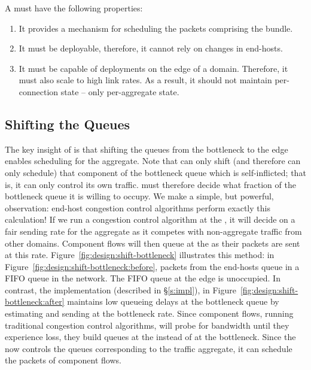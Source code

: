 A \name must have the following properties:
\begin{enumerate}
    \item It provides a mechanism for scheduling the packets comprising the bundle.
    \item It must be deployable, therefore, it cannot rely on changes in end-hosts.
    \item It must be capable of deployments on the edge of a domain. Therefore, it must also scale to high link rates. As a result, it should not maintain per-connection state -- only per-aggregate state.
\end{enumerate}

\subsection{Shifting the Queues}\label{s:design:shifting}

The key insight of \name is that shifting the queues from the bottleneck to the edge enables scheduling for the aggregate.
Note that \name can only shift (and therefore can only schedule) that component of the bottleneck queue which is self-inflicted; that is, it can only control its own traffic.
\name must therefore decide what fraction of the bottleneck queue it is willing to occupy.
We make a simple, but powerful, observation: end-host congestion control algorithms perform exactly this calculation!
If we run a congestion control algorithm at the \name, it will decide on a fair sending rate for the aggregate as it competes with non-aggregate traffic from other domains.
Component flows will then queue at the \name as their packets are sent at this rate.
Figure~\ref{fig:design:shift-bottleneck} illustrates this method: 
in Figure~\ref{fig:design:shift-bottleneck:before}, packets from the end-hosts queue in a FIFO queue in the network. The FIFO queue at the edge is unoccupied.
In contrast, the \name implementation (described in \S\ref{s:impl}), in Figure~\ref{fig:design:shift-bottleneck:after} maintains low queueing delays at the bottleneck queue by estimating and sending at the bottleneck rate. 
Since component flows, running traditional congestion control algorithms, will probe for bandwidth until they experience loss, they build queues at the \name instead of at the bottleneck.
Since the \name now controls the queues corresponding to the traffic aggregate, it can schedule the packets of component flows.

